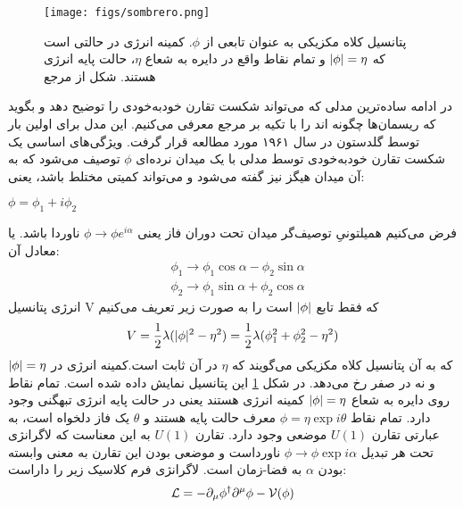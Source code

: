 \begin{figure}
	\begin{center}
		\texttt{[image: figs/sombrero.png]}
	\end{center}
	\caption[
	پتانسیل کلاه مکزیکی به عنوان تابعی از $\phi$. کمینه انرژی در حالتی است که
	$\abs{\phi} = \eta$
	و تمام نقاط واقع در دایره به شعاع $\eta$، حالت پایه انرژی هستند. شکل از مرجع 
	\cite{davis2005fundamental}]
	{  
		پتانسیل کلاه مکزیکی به عنوان تابعی از $\phi$. کمینه انرژی در حالتی است که
		$\abs{\phi} = \eta$
		و تمام نقاط واقع در دایره به شعاع $\eta$، حالت پایه انرژی هستند. شکل از مرجع 
		\cite{davis2005fundamental}
	}
	\label{fig:sombrero}
\end{figure}
\par

در ادامه ساده‌ترین مدلی که می‌تواند شکست تقارن خودبه‌خودی را توضیح دهد و بگوید که ریسمان‌ها چگونه اند را با تکیه بر مرجع
\cite{davis2005fundamental}
معرفی می‌کنیم. این مدل برای اولین بار توسط گلدستون
در سال ۱۹۶۱ مورد مطالعه قرار گرفت.
\cite{goldstone1961field}
ویژگی‌های اساسی یک شکست تقارن خودبه‌خودی توسط مدلی با یک میدان نرده‌ای 
$\phi$
توصیف می‌شود که به آن میدان هیگز نیز گفته می‌شود و می‌تواند کمیتی مختلط باشد، یعنی:
\begin{center}
$\phi = \phi_{1} +i\phi_{2}$
\end{center}
فرض می‌کنیم همیلتونیِ توصیف‌گر میدان تحت دوران فاز یعنی 
$ \phi \rightarrow \phi e^{i\alpha}$ 
ناوردا باشد. یا معادل آن:
\begin{equation}
\begin{split}
& \phi_1 \rightarrow \phi_1 \cos{\alpha} - \phi_2 \sin{\alpha} \\
& \phi_2 \rightarrow \phi_1 \sin{\alpha} + \phi_2 \cos{\alpha}
\end{split}
\end{equation}
انرژی پتانسیل V که فقط تابع
$\lvert\phi\rvert$
است را به صورت زیر تعریف می‌کنیم 
\begin{equation}
V = \frac{1}{2} \lambda ( \lvert\phi\rvert^{2} - \eta^{2}) = \frac{1}{2} \lambda ( \phi_1^{2} + \phi_2^{2} - \eta^{2})
\end{equation}
که به آن پتانسیل کلاه مکزیکی 
می‌گویند که $\eta$ در آن ثابت است.کمینه انرژی در
$\abs{\phi} = \eta$
و نه در صفر رخ می‌دهد. در شکل
\ref{fig:sombrero}
این پتانسیل نمایش داده شده است. تمام نقاط روی دایره به شعاع 
$\abs{\phi} = \eta$
 کمینه انرژی هستند یعنی در حالت پایه انرژی تبهگنی وجود دارد. تمام نقاط     
$\phi = \eta\exp{i\theta} $
معرف حالت پایه هستند و $\theta$ یک فاز دلخواه است، به عبارتی تقارن $U(1)$ موضعی وجود دارد. تقارن $U(1)$ به این معناست که لاگرانژی   تحت هر تبدیل $\phi \rightarrow \phi \exp{i\alpha} $ ناورداست و موضعی بودن این تقارن به معنی وابسته بودن $\alpha$ به فضا-زمان است.
لاگرانژی فرم کلاسیک زیر را داراست:
\begin{equation}
\cal L  = - \partial_{\mu} \phi^{\dagger}\space \partial^{\mu} \phi   - V(\phi)
\end{equation}

